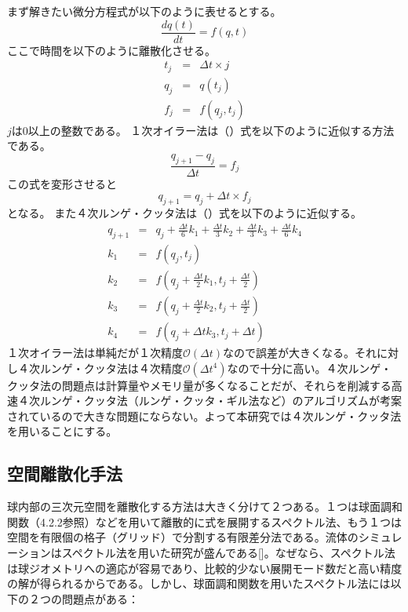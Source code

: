 \documentclass[12pt]{jsarticle}
\begin{document}
まず解きたい微分方程式が以下のように表せるとする。
\begin{equation}
\frac{dq(t)}{dt} = f(q,t) 
\end{equation}
ここで時間を以下のように離散化させる。
\begin{eqnarray}
t_j &=& \Delta t \times j      \\
q_j &=& q(t_j)      \\
f_j &=& f(q_j,t_j)     
\end{eqnarray}
$j$は0以上の整数である。
１次オイラー法は（）式を以下のように近似する方法である。
\begin{equation}
\frac{q_{j+1}-q_j}{\Delta t} = f_j 
\end{equation}
この式を変形させると
\begin{equation}
q_{j+1} = q_j + \Delta t \times  f_j 
\end{equation}
となる。
また４次ルンゲ・クッタ法は（）式を以下のように近似する。
\begin{eqnarray}
q_{j+1} &=& q_j + \frac{\Delta t}{6}k_1 + \frac{\Delta t}{3}k_2 + \frac{\Delta t}{3}k_3 + \frac{\Delta t}{6}k_4 \\
k_1 &=& f(q_j,t_j)  \\
k_2 &=& f(q_j+\frac{\Delta t}{2}k_1,t_j+\frac{\Delta t}{2})  \\
k_3 &=& f(q_j+\frac{\Delta t}{2}k_2,t_j+\frac{\Delta t}{2})  \\
k_4 &=& f(q_j+\Delta tk_3,t_j+\Delta t)
\end{eqnarray}
１次オイラー法は単純だが１次精度$\mathcal{O} \left( \Delta t \right)$なので誤差が大きくなる。それに対し４次ルンゲ・クッタ法は４次精度$\mathcal{O} \left( \Delta t^4 \right)$なので十分に高い。４次ルンゲ・クッタ法の問題点は計算量やメモリ量が多くなることだが、それらを削減する高速４次ルンゲ・クッタ法（ルンゲ・クッタ・ギル法など）のアルゴリズムが考案されているので大きな問題にならない。よって本研究では４次ルンゲ・クッタ法を用いることにする。


\subsection{空間離散化手法}
球内部の三次元空間を離散化する方法は大きく分けて２つある。１つは球面調和関数（4.2.2参照）などを用いて離散的に式を展開するスペクトル法、もう１つは空間を有限個の格子（グリッド）で分割する有限差分法である。流体のシミュレーションはスペクトル法を用いた研究が盛んである[]。なぜなら、スペクトル法は球ジオメトリへの適応が容易であり、比較的少ない展開モード数だと高い精度の解が得られるからである。しかし、球面調和関数を用いたスペクトル法には以下の２つの問題点がある：
\end{document}
